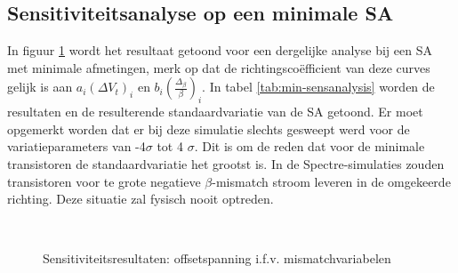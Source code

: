 \subsection{Sensitiviteitsanalyse op een minimale SA}
In figuur \ref{fig:min-sensanalysis} wordt het resultaat getoond voor een dergelijke analyse bij een SA met minimale afmetingen, merk op dat de richtingscoëfficient van deze curves gelijk is aan $a_{i} (\Delta V_{t})_{i}$ en $b_{i} (\frac{\Delta_{\beta}}{\beta})_{i}$.  In tabel \ref{tab:min-sensanalysis} worden de resultaten en de resulterende standaardvariatie van de SA getoond.
Er moet opgemerkt worden dat er bij deze simulatie slechts gesweept werd voor de variatieparameters van -4$\sigma$ tot 4 $\sigma$. Dit is om de reden dat voor de minimale transistoren de standaardvariatie het grootst is. In de Spectre-simulaties zouden transistoren voor te grote negatieve $\beta$-mismatch stroom leveren in de omgekeerde richting. Deze situatie zal fysisch nooit optreden.

\begin{figure}[!ht]
\centering
{} \\

\caption[Sensitiviteitsresultaten: offsetspanning i.f.v. mismatchvariabelen]{Sensitiviteitsresultaten: offsetspanning i.f.v. mismatchvariabelen}
\label{fig:min-sensanalysis}
\end{figure}


